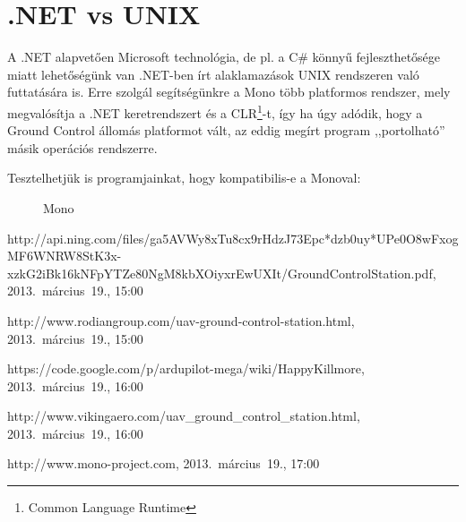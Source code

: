 \documentclass[12pt]{article}
\begin{document}
\section{.NET vs UNIX}
A .NET alapvet\H{o}en Microsoft technológia, de pl. a C\# könny\H{u} fejleszthet\H{o}sége miatt lehet\H{o}ségünk van .NET-ben írt alaklamazások UNIX rendszeren való futtatására is.
Erre szolgál segítségünkre a \cite{bib:mono}Mono több platformos rendszer, mely megvalósítja a .NET keretrendszert és a CLR\footnote{Common Language Runtime}-t, így ha úgy adódik, hogy a Ground Control állomás platformot vált, az eddig megírt program ,,portolható'' másik operációs rendszerre.

Tesztelhetjük is programjainkat, hogy kompatibilis-e a Monoval:
\begin{figure}[H]
	\centering
	\caption{Mono}
	\label{fig:mono}
\end{figure}



\begin{thebibliography}{9}

http://api.ning.com/files/ga5AVWy8xTu8cx9rHdzJ73Epc*dzb0uy*UPe0O8wFxogMF6WNRW8StK3x-xzkG2iBk16kNFpYTZe80NgM8kbXOiyxrEwUXIt/GroundControlStation.pdf, 2013.~március~19., 15:00

http://www.rodiangroup.com/uav-ground-control-station.html, 2013.~március~19., 15:00

https://code.google.com/p/ardupilot-mega/wiki/HappyKillmore, 2013.~március~19., 16:00


http://www.vikingaero.com/uav\_ground\_control\_station.html, 2013.~március~19., 16:00

http://www.mono-project.com, 2013.~március~19., 17:00

\end{thebibliography}
\end{document}
